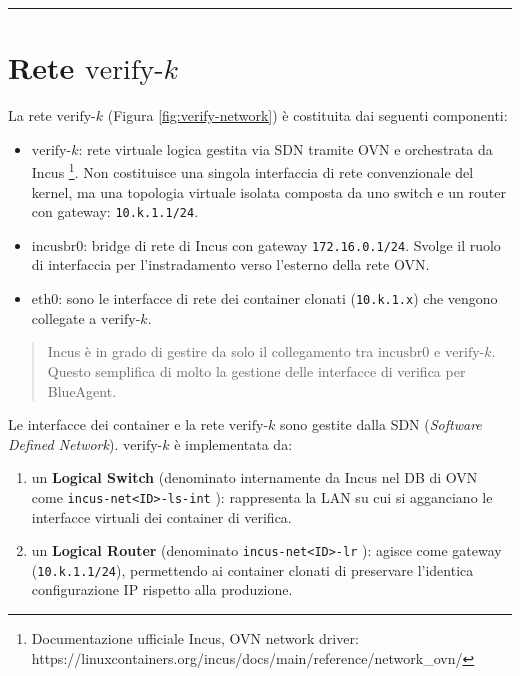 \begin{center}\rule{0.5\linewidth}{0.5pt}\end{center}

\section{\texorpdfstring{Rete
\(\text{verify-}k\)}{Rete \textbackslash text\{verify-\}k}}\label{rete-textverify-k}

La rete \(\text{verify-}k\) (Figura \ref{fig:verify-network}) è
costituita dai seguenti componenti:

\begin{itemize}
\tightlist
\item
  \(\text{verify-}k\): rete virtuale logica gestita via SDN tramite OVN
  e orchestrata da Incus \footnote{\label{fn:ref_17}Documentazione ufficiale Incus, OVN
    network driver:
    https://linuxcontainers.org/incus/docs/main/reference/network\_ovn/}.
  Non costituisce una singola interfaccia di rete convenzionale del
  kernel, ma una topologia virtuale isolata composta da uno switch e un
  router con gateway: \passthrough{\lstinline!10.k.1.1/24!}.
\item
  \(\text{incusbr0}\): bridge di rete di Incus con gateway
  \passthrough{\lstinline!172.16.0.1/24!}. Svolge il ruolo di
  interfaccia per l'instradamento verso l'esterno della rete OVN.
\item
  \(\text{eth0}\): sono le interfacce di rete dei container clonati
  (\passthrough{\lstinline!10.k.1.x!}) che vengono collegate a
  \(\text{verify-}k\).
\end{itemize}

\begin{quote}
Incus è in grado di gestire da solo il collegamento tra
\(\text{incusbr0}\) e \(\text{verify-}k\). Questo semplifica di molto la
gestione delle interfacce di verifica per BlueAgent.
\end{quote}

Le interfacce dei container e la rete \(\text{verify-}k\) sono gestite
dalla SDN (\emph{Software Defined Network}). \(\text{verify-}k\) è
implementata da:

\begin{enumerate}
\def\labelenumi{\arabic{enumi}.}
\tightlist
\item
  un \textbf{Logical Switch} (denominato internamente da Incus nel DB di
  OVN come \passthrough{\lstinline!incus-net<ID>-ls-int!} ):
  rappresenta la LAN su cui si agganciano le interfacce virtuali dei
  container di verifica.
\item
  un \textbf{Logical Router} (denominato
  \passthrough{\lstinline!incus-net<ID>-lr!} ):
  agisce come gateway (\passthrough{\lstinline!10.k.1.1/24!}),
  permettendo ai container clonati di preservare l'identica
  configurazione IP rispetto alla produzione.
\end{enumerate}

